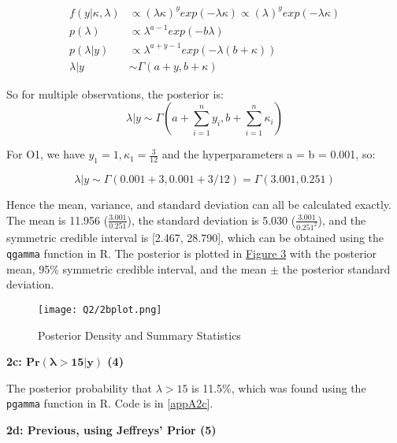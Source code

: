 \documentclass{article}
\begin{document}
\vspace{-0.5mm}

\begin{align}
f(y | \kappa, \lambda) &\propto (\lambda\kappa)^y exp(-\lambda \kappa) \propto (\lambda)^y exp(-\lambda \kappa)\\
p(\lambda) &\propto \lambda^{a-1}exp(-b\lambda) \\
p(\lambda | y) &\propto \lambda^{a + y - 1} exp(-\lambda (b+\kappa)) \\
\lambda | y &\sim \Gamma(a + y, b + \kappa)
\end{align}

So for multiple observations, the posterior is:
\begin{equation}
\lambda | y \sim \Gamma\left(a + \sum_{i=1}^{n}y_i, b + \sum_{i=1}^{n}\kappa_i\right) \label{eqgampoispost}
\end{equation}

For O1, we have $y_1 = 1, \kappa_1 = \frac{3}{12}$ and the hyperparameters a = b = 0.001, so:

\vspace{-3mm}

\begin{equation}
\lambda|y \sim \Gamma(0.001 + 3, 0.001 + 3/12) = \Gamma(3.001, 0.251)
\end{equation} 


Hence the mean, variance, and standard deviation can all be calculated exactly. The mean is 11.956 ($\frac{3.001}{0.251}$), the standard deviation is 5.030 ($\frac{3.001}{0.251^2}$), and the symmetric credible interval is [2.467, 28.790], which can be obtained using the \texttt{qgamma} function in R. The posterior is plotted in \hyperref[Fig2b]{Figure 3} with the posterior mean, 95\% symmetric credible interval, and the mean $\pm$ the posterior standard deviation. 

\begin{figure}[h]
\centering
\texttt{[image: Q2/2bplot.png]}
\caption{Posterior Density and Summary Statistics} \label{Fig2b}
\end{figure}


\textbf{2c: $\mathbf{Pr(\lambda > 15 | y)}$ (4)} \label{sec:2c}

The posterior probability that $\lambda > 15$ is 11.5\%, which was found using the \texttt{pgamma} function in R. Code is in \ref{appA2c}.  


\textbf{2d: Previous, using Jeffreys' Prior (5)} \label{sec:2d}
\end{document}
